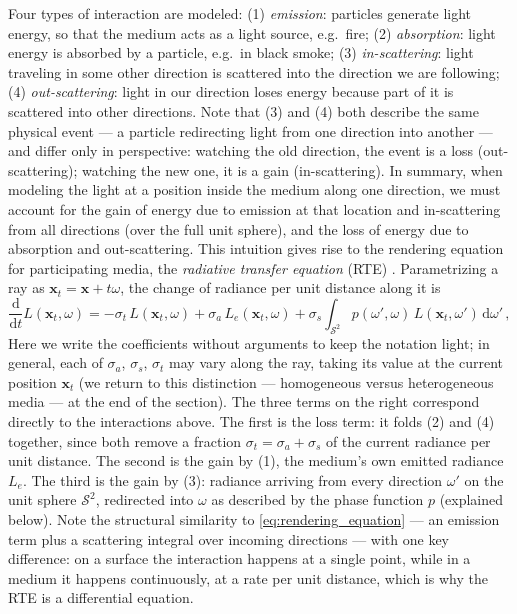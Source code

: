 Four types of interaction are modeled: (1) \emph{emission}: particles generate light energy, so that the medium acts as a light source, e.g.\ fire; (2) \emph{absorption}: light energy is absorbed by a particle, e.g.\ in black smoke; (3) \emph{in-scattering}: light traveling in some other direction is scattered into the direction we are following; (4) \emph{out-scattering}: light in our direction loses energy because part of it is scattered into other directions. Note that (3) and (4) both describe the same physical event --- a particle redirecting light from one direction into another --- and differ only in perspective: watching the old direction, the event is a loss (out-scattering); watching the new one, it is a gain (in-scattering). In summary, when modeling the light at a position inside the medium along one direction, we must account for the gain of energy due to emission at that location and in-scattering from all directions (over the full unit sphere), and the loss of energy due to absorption and out-scattering. This intuition gives rise to the rendering equation for participating media, the \emph{radiative transfer equation} (RTE) \cite{chandrasekhar50}. Parametrizing a ray as $\mathbf{x}_t = \mathbf{x} + t\omega$, the change of radiance per unit distance along it is
\begin{equation}
	\label{eq:rte}
	\frac{\mathrm{d}}{\mathrm{d}t} L(\mathbf{x}_t, \omega)
	= -\sigma_t \, L(\mathbf{x}_t, \omega)
	+ \sigma_a \, L_e(\mathbf{x}_t, \omega)
	+ \sigma_s \int_{\mathcal{S}^2} p(\omega', \omega) \, L(\mathbf{x}_t, \omega') \,\mathrm{d}\omega' \,,
\end{equation}
Here we write the coefficients without arguments to keep the notation light; in general, each of $\sigma_a$, $\sigma_s$, $\sigma_t$ may vary along the ray, taking its value at the current position $\mathbf{x}_t$ (we return to this distinction --- homogeneous versus heterogeneous media --- at the end of the section). The three terms on the right correspond directly to the interactions above. The first is the loss term: it folds (2) and (4) together, since both remove a fraction $\sigma_t = \sigma_a + \sigma_s$ of the current radiance per unit distance. The second is the gain by (1), the medium's own emitted radiance $L_e$. The third is the gain by (3): radiance arriving from every direction $\omega'$ on the unit sphere $\mathcal{S}^2$, redirected into $\omega$ as described by the phase function $p$ (explained below). Note the structural similarity to \cref{eq:rendering_equation} --- an emission term plus a scattering integral over incoming directions --- with one key difference: on a surface the interaction happens at a single point, while in a medium it happens continuously, at a rate per unit distance, which is why the RTE is a differential equation.

